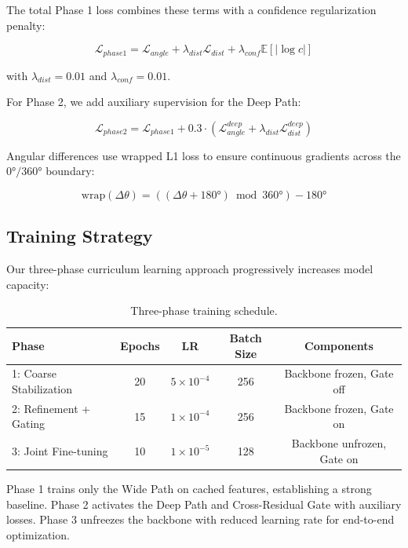 \documentclass[sigconf,nonacm]{acmart}
\begin{document}
The total Phase 1 loss combines these terms with a confidence regularization penalty:

\begin{equation}
\mathcal{L}_{phase1} = \mathcal{L}_{angle} + \lambda_{dist} \mathcal{L}_{dist} + \lambda_{conf} \mathbb{E}[|\log c|]
\end{equation}

with $\lambda_{dist} = 0.01$ and $\lambda_{conf} = 0.01$.

For Phase 2, we add auxiliary supervision for the Deep Path:

\begin{equation}
\mathcal{L}_{phase2} = \mathcal{L}_{phase1} + 0.3 \cdot (\mathcal{L}_{angle}^{deep} + \lambda_{dist} \mathcal{L}_{dist}^{deep})
\end{equation}

Angular differences use wrapped L1 loss to ensure continuous gradients across the $0°/360°$ boundary:

\begin{equation}
\text{wrap}(\Delta\theta) = ((\Delta\theta + 180°) \bmod 360°) - 180°
\end{equation}

\subsection{Training Strategy}

Our three-phase curriculum learning approach progressively increases model capacity:

\begin{table}[h]
\centering
\caption{Three-phase training schedule.}
\label{tab:training_phases}
\begin{tabular}{lcccc}
\toprule
Phase & Epochs & LR & Batch Size & Components \\
\midrule
1: Coarse Stabilization & 20 & $5 \times 10^{-4}$ & 256 & Backbone frozen, Gate off \\
2: Refinement + Gating & 15 & $1 \times 10^{-4}$ & 256 & Backbone frozen, Gate on \\
3: Joint Fine-tuning & 10 & $1 \times 10^{-5}$ & 128 & Backbone unfrozen, Gate on \\
\bottomrule
\end{tabular}
\end{table}

Phase 1 trains only the Wide Path on cached features, establishing a strong baseline. Phase 2 activates the Deep Path and Cross-Residual Gate with auxiliary losses. Phase 3 unfreezes the backbone with reduced learning rate for end-to-end optimization.
\end{document}
